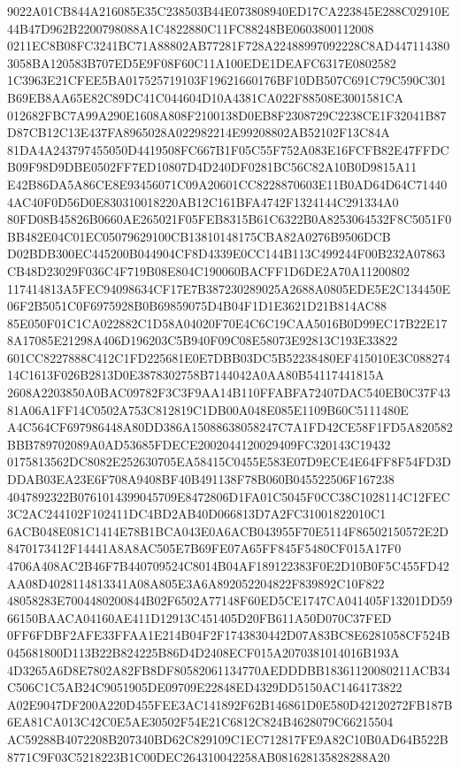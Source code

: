 \documentclass[UTF8,fontset=fandol,zihao=-4,a4paper]{ctexart}
\begin{document}
{{9022A01CB844A216085E35C238503B44E073808940ED17CA223845E288C02910E44B47D962B2200798088A1C4822880C11FC88248BE0603800112008
0211EC8B08FC3241BC71A88802AB77281F728A22488997092228C8AD4471143803058BA120583B707ED5E9F08F60C11A100EDE1DEAFC6317E0802582
1C3963E21CFEE5BA017525719103F19621660176BF10DB507C691C79C590C301B69EB8AA65E82C89DC41C044604D10A4381CA022F88508E3001581CA
012682FBC7A99A290E1608A808F2100138D0EB8F2308729C2238CE1F32041B87D87CB12C13E437FA8965028A022982214E99208802AB52102F13C84A
81DA4A243797455050D4419508FC667B1F05C55F752A083E16FCFB82E47FFDCB09F98D9DBE0502FF7ED10807D4D240DF0281BC56C82A10B0D9815A11
E42B86DA5A86CE8E93456071C09A20601CC8228870603E11B0AD64D64C714404AC40F0D56D0E830310018220AB12C161BFA4742F1324144C291334A0
80FD08B45826B0660AE265021F05FEB8315B61C6322B0A8253064532F8C5051F0BB482E04C01EC05079629100CB13810148175CBA82A0276B9506DCB
D02BDB300EC445200B044904CF8D4339E0CC144B113C499244F00B232A07863CB48D23029F036C4F719B08E804C190060BACFF1D6DE2A70A11200802
117414813A5FEC94098634CF17E7B387230289025A2688A0805EDE5E2C134450E06F2B5051C0F6975928B0B69859075D4B04F1D1E3621D21B814AC88
85E050F01C1CA022882C1D58A04020F70E4C6C19CAA5016B0D99EC17B22E178A17085E21298A406D196203C5B940F09C08E58073E92813C193E33822
601CC8227888C412C1FD225681E0E7DBB03DC5B52238480EF415010E3C08827414C1613F026B2813D0E3878302758B7144042A0AA80B54117441815A
2608A2203850A0BAC09782F3C3F9AA14B110FFABFA72407DAC540EB0C37F4381A06A1FF14C0502A753C812819C1DB00A048E085E1109B60C5111480E
A4C564CF697986448A80DD386A15088638058247C7A1FD42CE58F1FD5A820582BBB789702089A0AD53685FDECE2002044120029409FC320143C19432
0175813562DC8082E252630705EA58415C0455E583E07D9ECE4E64FF8F54FD3DDDAB03EA23E6F708A9408BF40B491138F78B060B045522506F167238
4047892322B0761014399045709E8472806D1FA01C5045F0CC38C1028114C12FEC3C2AC244102F102411DC4BD2AB40D066813D7A2FC31001822010C1
6ACB048E081C1414E78B1BCA043E0A6ACB043955F70E5114F86502150572E2D8470173412F14441A8A8AC505E7B69FE07A65FF845F5480CF015A17F0
4706A408AC2B46F7B440709524C8014B04AF189122383F0E2D10B0F5C455FD42AA08D4028114813341A08A805E3A6A892052204822F839892C10F822
48058283E7004480200844B02F6502A77148F60ED5CE1747CA041405F13201DD5966150BAACA04160AE411D12913C451405D20FB611A50D070C37FED
0FF6FDBF2AFE33FFAA1E214B04F2F1743830442D07A83BC8E6281058CF524B045681800D113B22B824225B86D4D2408ECF015A2070381014016B193A
4D3265A6D8E7802A82FB8DF80582061134770AEDDDBB18361120080211ACB34C506C1C5AB24C9051905DE09709E22848ED4329DD5150AC1464173822
A02E9047DF200A220D455FEE3AC141892F62B146861D0E580D42120272FB187B6EA81CA013C42C0E5AE30502F54E21C6812C824B4628079C66215504
AC59288B4072208B207340BD62C829109C1EC712817FE9A82C10B0AD64B522B8771C9F03C5218223B1C00DEC264310042258AB081628135828288A20
}}
\end{document}
